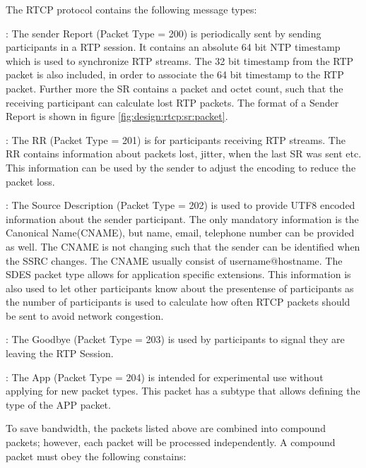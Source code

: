 The RTCP protocol contains the following message types:
\begin{itemize}
	: The sender Report (Packet Type = 200) is periodically sent by sending participants in a RTP session. It contains an absolute 64 bit NTP timestamp which is used to synchronize RTP streams. The 32 bit timestamp from the RTP packet is also included, in order to associate the 64 bit timestamp to the RTP packet. Further more the SR contains a packet and octet count, such that the receiving participant can calculate lost RTP packets. The format of a Sender Report is shown in figure \ref{fig:design:rtcp:sr:packet}.

	: The RR (Packet Type = 201) is for participants receiving RTP streams. The RR contains information about packets lost, jitter, when the last SR was sent etc. This information can be used by the sender to adjust the encoding to reduce the packet loss.

	: The Source Description (Packet Type = 202) is used to provide UTF8 encoded information about the sender participant. The only mandatory information is the Canonical Name(CNAME), but name, email, telephone number can be provided as well. The CNAME is not changing such that the sender can be identified when the SSRC changes. The CNAME usually consist of username@hostname. The SDES packet type allows for application specific extensions. This information is also used to let other participants know about the presentense of participants as the number of participants is used to calculate how often RTCP packets should be sent to avoid network congestion.

	: The Goodbye (Packet Type = 203) is used by participants to signal they are leaving the RTP Session. 
	
	: The App (Packet Type = 204) is intended for experimental use without applying for new packet types. This packet has a subtype that allows defining the type of the APP packet. 
\end{itemize}

To save bandwidth, the packets listed above are combined into compound packets; however, each packet will be processed independently.  A compound packet must obey the following constains:

